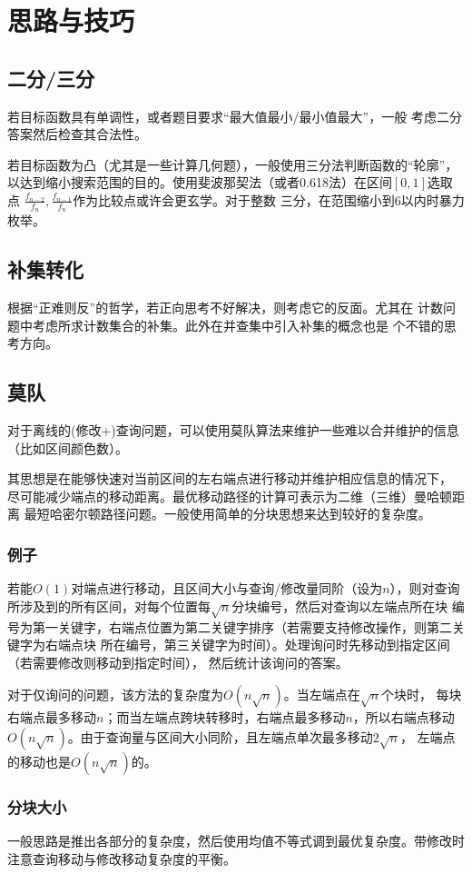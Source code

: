 \section{思路与技巧}
\subsection{二分/三分}
若目标函数具有单调性，或者题目要求``最大值最小/最小值最大''，一般
考虑二分答案然后检查其合法性。

若目标函数为凸（尤其是一些计算几何题），一般使用三分法判断函数的``轮廓''，
以达到缩小搜索范围的目的。使用斐波那契法（或者0.618法）在区间$[0,1]$选取点
$\frac{f_{n-2}}{f_n},\frac{f_{n-1}}{f_n}$作为比较点或许会更玄学。对于整数
三分，在范围缩小到6以内时暴力枚举。
\subsection{补集转化}
根据``正难则反''的哲学，若正向思考不好解决，则考虑它的反面。尤其在
计数问题中考虑所求计数集合的补集。此外在并查集中引入补集的概念也是
个不错的思考方向。
\subsection{莫队}
对于离线的(修改+)查询问题，可以使用莫队算法来维护一些难以合并维护的信息
（比如区间颜色数）。

其思想是在能够快速对当前区间的左右端点进行移动并维护相应信息的情况下，
尽可能减少端点的移动距离。最优移动路径的计算可表示为二维（三维）曼哈顿距离
最短哈密尔顿路径问题。一般使用简单的分块思想来达到较好的复杂度。

\subsubsection{例子}
若能$O(1)$对端点进行移动，且区间大小与查询/修改量同阶（设为$n$），则对查询
所涉及到的所有区间，对每个位置每$\sqrt{n}$分块编号，然后对查询以左端点所在块
编号为第一关键字，右端点位置为第二关键字排序（若需要支持修改操作，则第二关键字为右端点块
所在编号，第三关键字为时间）。处理询问时先移动到指定区间（若需要修改则移动到指定时间），
然后统计该询问的答案。

对于仅询问的问题，该方法的复杂度为$O(n\sqrt{n})$。当左端点在$\sqrt{n}$个块时，
每块右端点最多移动$n$；而当左端点跨块转移时，右端点最多移动$n$，所以右端点移动
$O(n\sqrt{n})$。由于查询量与区间大小同阶，且左端点单次最多移动$2\sqrt{n}$，
左端点的移动也是$O(n\sqrt{n})$的。
\subsubsection{分块大小}
一般思路是推出各部分的复杂度，然后使用均值不等式调到最优复杂度。带修改时
注意查询移动与修改移动复杂度的平衡。
